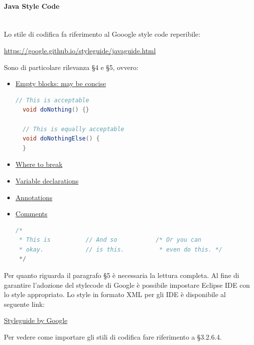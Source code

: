 \paragraph{Java Style Code}\mbox{}\\
Lo stile di codifica fa riferimento al Gooogle style code reperibile:
\begin{center}
\url{https://google.github.io/styleguide/javaguide.html}
\end{center}
Sono di particolare rilevanza §4 e §5, ovvero:
\begin{itemize}
\item \href{https://google.github.io/styleguide/javaguide.html#s4.1.3-braces-empty-blocks}{Empty blocks: may be concise}\\
\begin{lstlisting}[frame=single, language=java]
  // This is acceptable
  void doNothing() {}

  // This is equally acceptable
  void doNothingElse() {
  }
 \end{lstlisting}
\item \href{https://google.github.io/styleguide/javaguide.html#s4.5.1-line-wrapping-where-to-break}{Where to break}

\item \href{https://google.github.io/styleguide/javaguide.html#s4.8.2-variable-declarations}{Variable declarations}
\item \href{https://google.github.io/styleguide/javaguide.html#s4.8.5-annotations}{Annotations}
\item \href{https://google.github.io/styleguide/javaguide.html#s4.8.6-comments}{Comments}\\
\begin{lstlisting}[frame=single, language=java]
/*
 * This is          // And so           /* Or you can
 * okay.            // is this.          * even do this. */
 */
 \end{lstlisting}
\end{itemize}
Per quanto riguarda il paragrafo §5 è necessaria la lettura completa.
Al fine di garantire l'adozione del stylecode di Google è possibile impostare Eclipse IDE con lo style appropriato.
Lo style in formato {XML} per gli IDE è disponibile al seguente link:
\begin{center}
\href{https://github.com/google/styleguide}{Styleguide by Google}
\end{center}
Per vedere come importare gli stili di codifica fare riferimento a §3.2.6.4.

